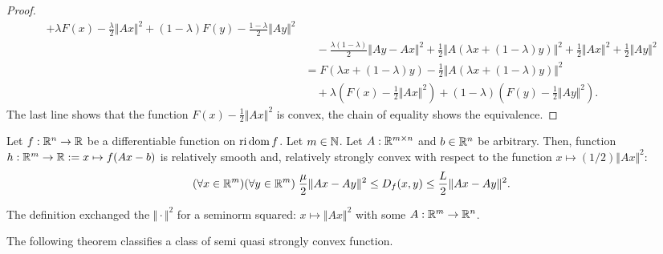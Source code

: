 \documentclass[12pt]{article}
\begin{document}
\begin{proof}
{\begin{align*}
                    + \lambda F(x) - \frac{\lambda}{2}\Vert Ax\Vert^2 
                    + (1 - \lambda)F(y) - \frac{1 - \lambda}{2} \Vert Ay\Vert^2 
                        \\ &\quad 
                        - \frac{\lambda(1 - \lambda)}{2} \Vert Ay - Ax\Vert^2 + \frac{1}{2}\Vert A(\lambda x + (1 - \lambda)y)\Vert^2
                        + \frac{1}{2}\Vert Ax\Vert^2 + \frac{1}{2}\Vert Ay\Vert^2 
                    \\
                    &= 
                    F(\lambda x + (1 - \lambda)y) - \frac{1}{2}\Vert A(\lambda x + (1 - \lambda)y)\Vert^2 
                        \\ &\quad 
                        + \lambda \left(F(x) - \frac{1}{2}\Vert Ax\Vert^2\right) 
                        + (1 - \lambda)\left(F(y) - \frac{1}{2} \Vert Ay\Vert^2\right). 
                \end{align*}
                }
                The last line shows that the function $F(x) - \frac{1}{2}\Vert Ax\Vert^2$ is convex, the chain of equality shows the equivalence. 
            \end{proof}
            \begin{definition}\label{def:seminorm-smooth-scnvx}
                Let $f:\mathbb R^n \rightarrow \mathbb R$ be a differentiable function on $\operatorname{ri}\operatorname{dom} f$. 
                Let $m \in \mathbb N$. 
                Let $A: \mathbb R^{m\times n}$ and $b \in \mathbb R^n$ be arbitrary. 
                Then, function $h: \mathbb R^m \rightarrow \mathbb R :=  x\mapsto f(Ax - b)$ is relatively smooth and, relatively strongly convex with respect to the function $x \mapsto (1/2)\Vert A x\Vert^2$: 
                \begin{align*}
                    (\forall x \in \mathbb R^m)(\forall y \in \mathbb R^m)\;
                    \frac{\mu}{2}\Vert Ax - Ay\Vert^2 \le 
                    D_f(x, y) \le \frac{L}{2}\Vert Ax - Ay\Vert^2. 
                \end{align*}
            \end{definition}
            \begin{remark}
                The definition exchanged the $\Vert \cdot\Vert^2$ for a seminorm squared: $x \mapsto \Vert Ax\Vert^2$ with some $A: \mathbb R^m \rightarrow \mathbb R^n$. 
            \end{remark}
            The following theorem classifies a class of semi quasi strongly convex function. 
\end{document}
